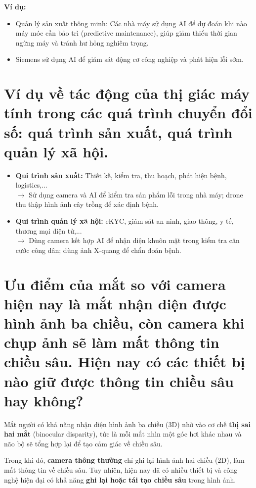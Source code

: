 \documentclass[12pt]{article}
\begin{document}
	\textbf{Ví dụ:}
	\begin{itemize}
		\item Quản lý sản xuất thông minh: Các nhà máy sử dụng AI để dự đoán khi nào máy móc cần bảo trì (predictive maintenance), giúp giảm thiểu thời gian ngừng máy và tránh hư hỏng nghiêm trọng.
		\item Siemens sử dụng AI để giám sát động cơ công nghiệp và phát hiện lỗi sớm.
	\end{itemize}
	
	\section{Ví dụ về tác động của thị giác máy tính trong các quá trình chuyển đổi số: quá trình sản xuất, quá trình quản lý xã hội. }
	
	\begin{itemize}
	\item \textbf{Qui trình sản xuất:} Thiết kế, kiểm tra, thu hoạch, phát hiện bệnh, logistics,...\\
	$\rightarrow$ Sử dụng camera và AI để kiểm tra sản phẩm lỗi trong nhà máy; drone thu thập hình ảnh cây trồng để xác định bệnh.
	
	\item \textbf{Qui trình quản lý xã hội:} eKYC, giám sát an ninh, giao thông, y tế, thương mại điện tử,...\\
	$\rightarrow$ Dùng camera kết hợp AI để nhận diện khuôn mặt trong kiểm tra căn cước công dân; dùng ảnh X-quang để chẩn đoán bệnh.
	\end{itemize}
	
	\section{Ưu điểm của mắt so với camera hiện nay là mắt nhận diện được hình ảnh ba chiều, còn camera khi chụp ảnh sẽ làm mất thông tin chiều sâu. Hiện nay có các thiết bị nào giữ được thông tin chiều sâu hay không?}
	
	Mắt người có khả năng nhận diện hình ảnh ba chiều (3D) nhờ vào cơ chế \textbf{thị sai hai mắt} (binocular disparity), tức là mỗi mắt nhìn một góc hơi khác nhau và não bộ sẽ tổng hợp lại để tạo cảm giác về chiều sâu.
	
	Trong khi đó, \textbf{camera thông thường} chỉ ghi lại hình ảnh hai chiều (2D), làm mất thông tin về chiều sâu. Tuy nhiên, hiện nay đã có nhiều thiết bị và công nghệ hiện đại có khả năng \textbf{ghi lại hoặc tái tạo chiều sâu} trong hình ảnh.
	
\end{document}
